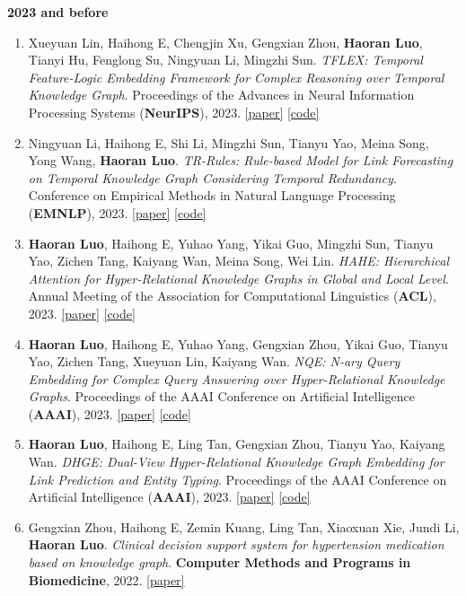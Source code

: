 \documentclass[letterpaper,11pt]{article}
\begin{document}
\vspace{0.5mm}
\textbf{2023 and before}
\begin{enumerate}[resume*=resumeCounter, itemsep=0mm, topsep=2mm, leftmargin=*]
\item Xueyuan Lin, Haihong E, Chengjin Xu, Gengxian Zhou, \textbf{Haoran Luo}, Tianyi Hu, Fenglong Su, Ningyuan Li, Mingzhi Sun. \emph{TFLEX: Temporal Feature-Logic Embedding Framework for Complex Reasoning over Temporal Knowledge Graph}. Proceedings of the Advances in Neural Information Processing Systems (\textbf{NeurIPS}), 2023. \href{https://proceedings.neurips.cc/paper_files/paper/2023/hash/e71a42c64851834013e2658b69d7fe93-Abstract-Conference.html}{[paper]} \href{https://github.com/LinXueyuanStdio/TFLEX}{[code]}
\item Ningyuan Li, Haihong E, Shi Li, Mingzhi Sun, Tianyu Yao, Meina Song, Yong Wang, \textbf{Haoran Luo}. \emph{TR-Rules: Rule-based Model for Link Forecasting on Temporal Knowledge Graph Considering Temporal Redundancy}. Conference on Empirical Methods in Natural Language Processing (\textbf{EMNLP}), 2023. \href{https://aclanthology.org/2023.findings-emnlp.529/}{[paper]} \href{https://github.com/JasonLee-22/TR-Rules}{[code]}
\item \textbf{Haoran Luo}, Haihong E, Yuhao Yang, Yikai Guo, Mingzhi Sun, Tianyu Yao, Zichen Tang, Kaiyang Wan, Meina Song, Wei Lin. \emph{HAHE: Hierarchical Attention for Hyper-Relational Knowledge Graphs in Global and Local Level}. Annual Meeting of the Association for Computational Linguistics (\textbf{ACL}), 2023. \href{https://aclanthology.org/2023.acl-long.450/}{[paper]} \href{https://github.com/LHRLAB/HAHE}{[code]}
\item \textbf{Haoran Luo}, Haihong E, Yuhao Yang, Gengxian Zhou, Yikai Guo, Tianyu Yao, Zichen Tang, Xueyuan Lin, Kaiyang Wan. \emph{NQE: N-ary Query Embedding for Complex Query Answering over Hyper-Relational Knowledge Graphs}. Proceedings of the AAAI Conference on Artificial Intelligence (\textbf{AAAI}), 2023. \href{https://ojs.aaai.org/index.php/AAAI/article/view/25576}{[paper]} \href{https://github.com/LHRLAB/NQE}{[code]}
\item \textbf{Haoran Luo}, Haihong E, Ling Tan, Gengxian Zhou, Tianyu Yao, Kaiyang Wan. \emph{DHGE: Dual-View Hyper-Relational Knowledge Graph Embedding for Link Prediction and Entity Typing}. Proceedings of the AAAI Conference on Artificial Intelligence (\textbf{AAAI}), 2023. \href{https://ojs.aaai.org/index.php/AAAI/article/view/25795}{[paper]} \href{https://github.com/LHRLAB/DHGE}{[code]}
\item Gengxian Zhou, Haihong E, Zemin Kuang, Ling Tan, Xiaoxuan Xie, Jundi Li, \textbf{Haoran Luo}. \emph{Clinical decision support system for hypertension medication based on knowledge graph}. \textbf{Computer Methods and Programs in Biomedicine}, 2022. \href{https://www.sciencedirect.com/science/article/abs/pii/S0169260722006010}{[paper]}
\end{enumerate}
\end{document}
